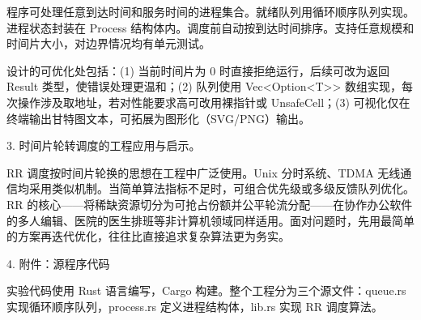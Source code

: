 \noindent\hspace*{2em}程序可处理任意到达时间和服务时间的进程集合。就绪队列用循环顺序队列实现。进程状态封装在 Process 结构体内。调度前自动按到达时间排序。支持任意规模和时间片大小，对边界情况均有单元测试。\par
\noindent\hspace*{2em}设计的可优化处包括：(1) 当前时间片为 0 时直接拒绝运行，后续可改为返回 Result 类型，使错误处理更温和；(2) 队列使用 Vec<Option<T>> 数组实现，每次操作涉及取地址，若对性能要求高可改用裸指针或 UnsafeCell；(3) 可视化仅在终端输出甘特图文本，可拓展为图形化（SVG/PNG）输出。\par
\noindent\hspace*{2em}3. 时间片轮转调度的工程应用与启示。\par
\noindent\hspace*{2em}RR 调度按时间片轮换的思想在工程中广泛使用。Unix 分时系统、TDMA 无线通信均采用类似机制。当简单算法指标不足时，可组合优先级或多级反馈队列优化。RR 的核心——将稀缺资源切分为可抢占份额并公平轮流分配——在协作办公软件的多人编辑、医院的医生排班等非计算机领域同样适用。面对问题时，先用最简单的方案再迭代优化，往往比直接追求复杂算法更为务实。\par
\noindent\hspace*{2em}4. 附件：源程序代码\par
\noindent\hspace*{2em}实验代码使用 Rust 语言编写，Cargo 构建。整个工程分为三个源文件：queue.rs 实现循环顺序队列，process.rs 定义进程结构体，lib.rs 实现 RR 调度算法。\par
